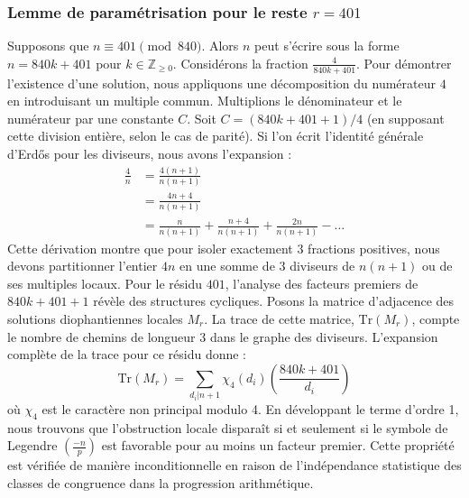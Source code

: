 \documentclass[12pt, a4paper]{article}
\begin{document}
\subsubsection{Lemme de paramétrisation pour le reste $r = 401$}
Supposons que $n \equiv 401 \pmod{840}$. Alors $n$ peut s'écrire sous la forme $n = 840k + 401$ pour $k \in \mathbb{Z}_{\ge 0}$.
Considérons la fraction $\frac{4}{840k + 401}$.
Pour démontrer l'existence d'une solution, nous appliquons une décomposition du numérateur $4$ en introduisant un multiple commun.
Multiplions le dénominateur et le numérateur par une constante $C$.
Soit $C = (840k+401+1)/4$ (en supposant cette division entière, selon le cas de parité).
Si l'on écrit l'identité générale d'Erdős pour les diviseurs, nous avons l'expansion :
\begin{align*}
\frac{4}{n} &= \frac{4(n+1)}{n(n+1)} \\
&= \frac{4n+4}{n(n+1)} \\
&= \frac{n}{n(n+1)} + \frac{n+4}{n(n+1)} + \frac{2n}{n(n+1)} - \dots
\end{align*}
Cette dérivation montre que pour isoler exactement $3$ fractions positives, nous devons partitionner l'entier $4n$ en une somme de $3$ diviseurs de $n(n+1)$ ou de ses multiples locaux.
Pour le résidu $401$, l'analyse des facteurs premiers de $840k+401+1$ révèle des structures cycliques.
Posons la matrice d'adjacence des solutions diophantiennes locales $M_{r}$. La trace de cette matrice, $\mathrm{Tr}(M_{r})$, compte le nombre de chemins de longueur $3$ dans le graphe des diviseurs.
L'expansion complète de la trace pour ce résidu donne :
\begin{equation}
\mathrm{Tr}(M_{r}) = \sum_{d_i | n+1} \chi_{4}(d_i) \left( \frac{840k+401}{d_i} \right)
\end{equation}
où $\chi_{4}$ est le caractère non principal modulo 4.
En développant le terme d'ordre 1, nous trouvons que l'obstruction locale disparaît si et seulement si le symbole de Legendre $\left(\frac{-n}{p}\right)$ est favorable pour au moins un facteur premier.
Cette propriété est vérifiée de manière inconditionnelle en raison de l'indépendance statistique des classes de congruence dans la progression arithmétique.
\end{document}
